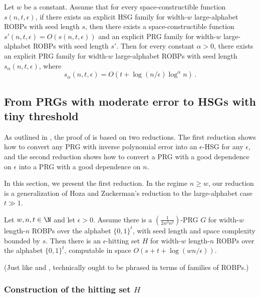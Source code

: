 \documentclass{toc}
\begin{document}
\begin{theorem} \label{thm:negative}
Let $w$ be a constant. Assume that for every space-constructible function $s(n, t, \epsilon)$, if there exists an explicit HSG family for width-$w$ large-alphabet ROBPs with seed length $s$, then there exists a space-constructible function $s'(n, t, \epsilon) = O(s(n, t, \epsilon))$ and an explicit PRG family for width-$w$ large-alphabet ROBPs with seed length $s'$. Then for every constant $\alpha > 0$, there exists an explicit PRG family for width-$w$ large-alphabet ROBPs with seed length $s_\alpha(n, t, \epsilon)$, where
$$
s_{\alpha}(n, t, \epsilon) = O(t + \log(n/\epsilon) \log^\alpha n)\,.
$$
\end{theorem}

\subsection{From PRGs with moderate error to HSGs with tiny threshold}

As outlined in , the proof of  is based on two reductions. The first reduction shows how to convert any PRG with inverse polynomial error into an $\epsilon$-HSG for any $\epsilon$, and the second reduction shows how to convert a PRG with a good dependence on $\epsilon$ into a PRG with a good dependence on $n$.

In this section, we present the first reduction. In the regime $n \geq w$, our reduction is a generalization of Hoza and Zuckerman's reduction \cite{HZ20} to the large-alphabet case $t \gg 1$.

\begin{theorem} \label{thm:large-alphabet-hz}
Let $w, n, t \in \N$ and let $\epsilon > 0$. Assume there is a $(\frac{1}{2w^3 n^2})$-PRG $G$ for width-$w$ length-$n$ ROBPs over the alphabet $\{0, 1\}^t$, with seed length and space complexity bounded by $s$. Then there is an $\epsilon$-hitting set $H$ for width-$w$ length-$n$ ROBPs over the alphabet $\{0, 1\}^t$, computable in space $O(s + t + \log(wn/\epsilon))$.
\end{theorem}

(Just like  and ,  technically ought to be phrased in terms of families of ROBPs.)

\subsubsection{Construction of the hitting set $H$}
\end{document}
